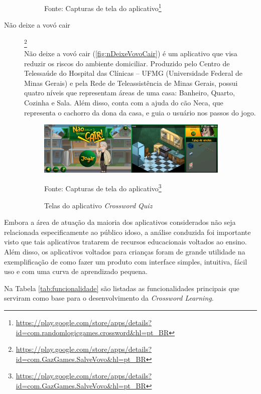 \begin{description}
\begin{figure}[H]
    Fonte: Capturas de tela do aplicativo\footnote{\url{https://play.google.com/store/apps/details?id=com.randomlogicgames.crossword&hl=pt_BR}}
\end{figure}


\item[Não deixe a vovó cair]\footnote{\url{https://play.google.com/store/apps/details?id=com.GazGames.SalveVovo&hl=pt_BR}} \hfill \\
Não deixe a vovó cair (\autoref{fig:nDeixeVovoCair}) é um aplicativo que visa reduzir os riscos do ambiente domiciliar. Produzido pelo Centro de Telessaúde do Hospital das Clínicas – UFMG (Universidade Federal de Minas Gerais) e pela Rede de Teleassistência de Minas Gerais, possui quatro níveis que representam áreas de uma casa: Banheiro, Quarto, Cozinha e Sala. Além disso, conta com a ajuda do cão Neca, que representa o cachorro da dona da casa, e guia o usuário nos passos do jogo.
\begin{figure}[H]
\centering
    \caption{Telas do aplicativo \textit{Crossword Quiz}}
    \label{fig:nDeixeVovoCair}
    \includegraphics[width=0.9\textwidth]{Figuras/nDeixeVovoCair.jpg}
    
    Fonte: Capturas de tela do aplicativo\footnote{\url{https://play.google.com/store/apps/details?id=com.GazGames.SalveVovo&hl=pt_BR}}
\end{figure}

\end{description}

Embora a área de atuação da maioria dos aplicativos considerados não seja relacionada especificamente ao público idoso, a análise conduzida foi importante visto que tais aplicativos tratarem de recursos educacionais voltados ao ensino. Além disso, os aplicativos voltados para crianças foram de grande utilidade na exemplificação de como fazer um produto com interface simples, intuitiva, fácil uso e com uma curva de aprendizado pequena. 

Na Tabela \ref{tab:funcionalidade} são listadas as funcionalidades principais que serviram como base para o desenvolvimento da \textit{Crossword Learning}.

